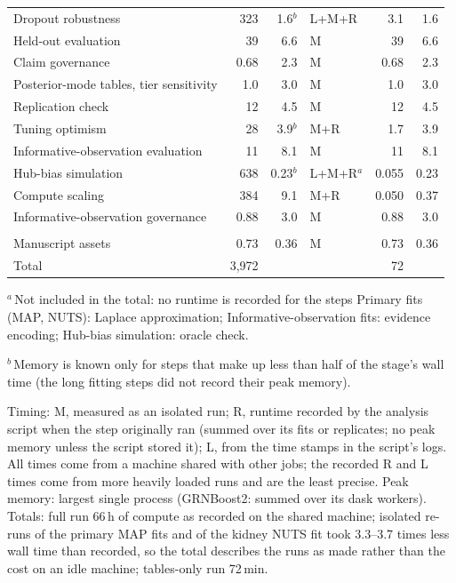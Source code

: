 \documentclass[11pt,a4paper]{article}
\begin{document}
\begin{table}[tbp]
\begin{tabular}{@{}lrrlrr@{}}
Dropout robustness & 323 & 1.6$^{b}$ & L+M+R & 3.1 & 1.6 \\
Held-out evaluation & 39 & 6.6 & M & 39 & 6.6 \\
Claim governance & 0.68 & 2.3 & M & 0.68 & 2.3 \\
Posterior-mode tables, tier sensitivity & 1.0 & 3.0 & M & 1.0 & 3.0 \\
Replication check & 12 & 4.5 & M & 12 & 4.5 \\
Tuning optimism & 28 & 3.9$^{b}$ & M+R & 1.7 & 3.9 \\
Informative-observation evaluation & 11 & 8.1 & M & 11 & 8.1 \\
Hub-bias simulation & 638 & 0.23$^{b}$ & L+M+R$^{a}$ & 0.055 & 0.23 \\
Compute scaling & 384 & 9.1 & M+R & 0.050 & 0.37 \\
Informative-observation governance & 0.88 & 3.0 & M & 0.88 & 3.0 \\
\addlinespace[3pt]
\multicolumn{6}{@{}l}{\emph{Assets}} \\
Manuscript assets & 0.73 & 0.36 & M & 0.73 & 0.36 \\
\midrule
Total & 3{,}972 &  &  & 72 &  \\
\bottomrule
\end{tabular}
\par\smallskip
\begin{minipage}{\linewidth}\footnotesize
$^{a}$\,Not included in the total: no runtime is recorded for the steps Primary fits (MAP, NUTS): Laplace approximation; Informative-observation fits: evidence encoding; Hub-bias simulation: oracle check.

$^{b}$\,Memory is known only for steps that make up less than half of the stage's wall time (the long fitting steps did not record their peak memory).

Timing: M, measured as an isolated run; R, runtime recorded by the analysis script when the step originally ran (summed over its fits or replicates; no peak memory unless the script stored it); L, from the time stamps in the script's logs. All times come from a machine shared with other jobs; the recorded R and L times come from more heavily loaded runs and are the least precise. Peak memory: largest single process (GRNBoost2: summed over its dask workers). Totals: full run 66\,h of compute as recorded on the shared machine; isolated re-runs of the primary MAP fits and of the kidney NUTS fit took 3.3--3.7 times less wall time than recorded, so the total describes the runs as made rather than the cost on an idle machine; tables-only run 72\,min.
\end{minipage}
\end{table}
\end{document}
